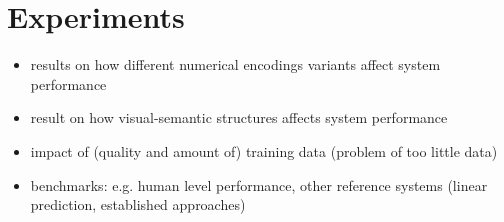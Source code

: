 \chapter{Experiments}

\begin{itemize}
	\item results on how different numerical encodings variants affect system performance
	\item result on how visual-semantic structures affects system performance
	\item impact of (quality and amount of) training data (problem of too little data)
	\item benchmarks: e.g. human level performance, other reference systems (linear prediction, established approaches)
\end{itemize}